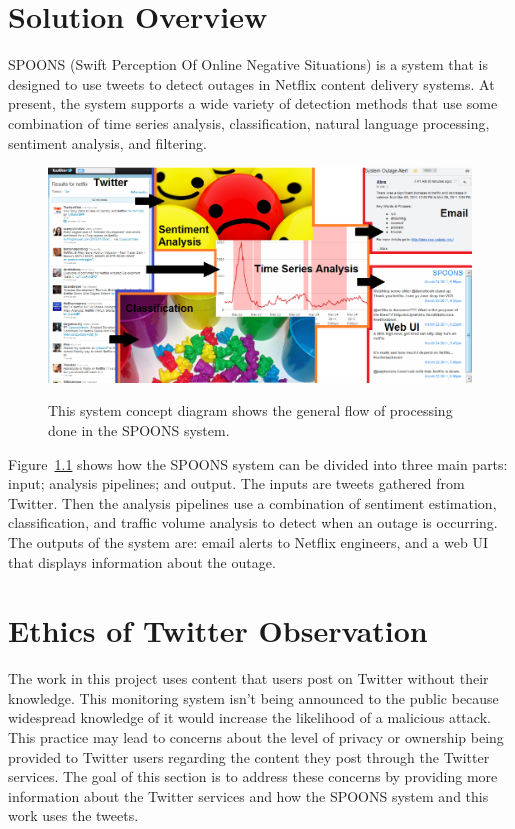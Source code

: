\documentclass[12pt]{ucthesis}
\newcommand{\captionfonts}{\small\bf\ssp}
\begin{document}
\chapter{Solution Overview}
\label{overview}

SPOONS (Swift Perception Of Online Negative Situations) is a system that is
designed to use tweets to detect outages in Netflix content delivery systems.
At present, the system supports a wide variety of detection methods that use some combination of time
series analysis, classification, natural language processing, sentiment
analysis, and filtering.

\begin{figure}
   \begin{center}
      \includegraphics[width=140mm]{images/systemFlow.eps}
      \captionfonts
      \caption[System Concept Diagram]{This system concept diagram shows the general
                                       flow of processing done in the SPOONS system.}
      \label{fig:systemFlow}
   \end{center}
\end{figure}

Figure~\ref{fig:systemFlow} shows how the SPOONS system can be divided into three
main parts: input; analysis pipelines; and output.
The inputs are tweets gathered from Twitter. Then the
analysis pipelines use a combination of sentiment estimation, classification, and
traffic volume analysis to detect when an outage is occurring.
The outputs of the system are: email alerts to Netflix engineers, and a web UI that displays
information about the outage.

\chapter{Ethics of Twitter Observation}

The work in this project uses content that users post on Twitter without their
knowledge. This monitoring system isn't being announced to the
public because widespread knowledge of it would increase the likelihood of a
malicious attack. This practice may lead to concerns about the level of privacy
or ownership being provided to Twitter users regarding the content they post
through the Twitter services. The goal of this section is to address these
concerns by providing more information about the Twitter services and how the
SPOONS system and this work uses the tweets.
\end{document}
